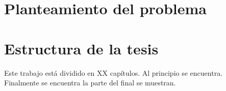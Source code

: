 



\section{Planteamiento del problema}




\section{Estructura de la tesis}

Este trabajo está dividido en XX capítulos. Al principio se encuentra.\\

Finalmente se encuentra la parte del final se muestran.\\
